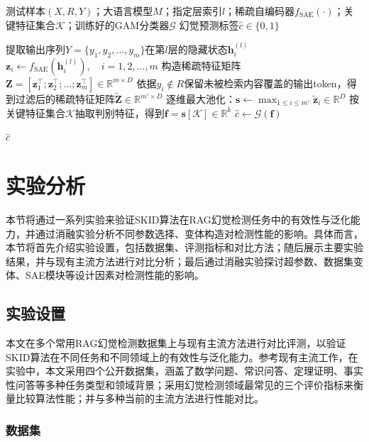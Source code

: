 \begin{algorithm}[htbp]
\caption{SKID算法（测试阶段）}
\label{alg:skid_test}
\begin{algorithmic}[1]
\Require 测试样本$(X,R,Y)$；大语言模型$M$；指定层索引$l$；稀疏自编码器$f_{\mathrm{SAE}}(\cdot)$；关键特征集合$\mathcal{K}$；训练好的GAM分类器$\mathcal{G}$
\Ensure 幻觉预测标签$\hat{c}\in\{0,1\}$

\State 提取输出序列$Y=\{y_1,y_2,\dots,y_m\}$在第$l$层的隐藏状态$\mathbf{h}^{(l)}_i$
\State $\mathbf{z}_i \gets f_{\mathrm{SAE}}(\mathbf{h}^{(l)}_i),\quad i=1,2,\dots,m$
\State 构造稀疏特征矩阵$\mathbf{Z}=[\mathbf{z}_1^\top;\mathbf{z}_2^\top;\dots;\mathbf{z}_m^\top]\in\mathbb{R}^{m\times D}$
\State 依据$y_i\notin R$保留未被检索内容覆盖的输出token，得到过滤后的稀疏特征矩阵$\widetilde{\mathbf{Z}}\in\mathbb{R}^{m'\times D}$
\State 逐维最大池化：$\mathbf{s}\gets \max_{1\leq i\leq m'}\widetilde{\mathbf{z}}_i\in\mathbb{R}^{D}$
\State 按关键特征集合$\mathcal{K}$抽取判别特征，得到$\mathbf{f}=\mathbf{s}\left[\mathcal{K}\right]\in\mathbb{R}^{k}$
\State $\hat{c}\gets \mathcal{G}(\mathbf{f})$

\State \Return $\hat{c}$
\end{algorithmic}
\end{algorithm}

\section{实验分析}

本节将通过一系列实验来验证SKID算法在RAG幻觉检测任务中的有效性与泛化能力，并通过消融实验分析不同参数选择、变体构造对检测性能的影响。具体而言，本节将首先介绍实验设置，包括数据集、评测指标和对比方法；随后展示主要实验结果，并与现有主流方法进行对比分析；最后通过消融实验探讨超参数、数据集变体、SAE模块等设计因素对检测性能的影响。

\subsection{实验设置}\label{subsec:skid_experiment_settings}

本文在多个常用RAG幻觉检测数据集上与现有主流方法进行对比评测，以验证SKID算法在不同任务和不同领域上的有效性与泛化能力。参考现有主流工作\cite{xiong2025toward}，在实验中，本文采用四个公开数据集，涵盖了数学问题、常识问答、定理证明、事实性问答等多种任务类型和领域背景；采用幻觉检测领域最常见的三个评价指标来衡量比较算法性能；并与多种当前的主流方法进行性能对比。

\subsubsection{数据集}

